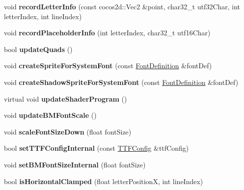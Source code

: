 \begin{DoxyCompactItemize}
void {\bfseries record\+Letter\+Info} (const cocos2d\+::\+Vec2 \&point, char32\+\_\+t utf32\+Char, int letter\+Index, int line\+Index)
\item 
\mbox{\label{classLabel_a8cd1070154b7311948770be1b573b10e}} 
void {\bfseries record\+Placeholder\+Info} (int letter\+Index, char32\+\_\+t utf16\+Char)
\item 
\mbox{\label{classLabel_afeb07526c7455452ee5546f5a81f6cd5}} 
bool {\bfseries update\+Quads} ()
\item 
\mbox{\label{classLabel_a23d6bc9e3ef5ebd8b73ae0ca532f942a}} 
void {\bfseries create\+Sprite\+For\+System\+Font} (const \hyperlink{structFontDefinition}{Font\+Definition} \&font\+Def)
\item 
\mbox{\label{classLabel_a162180bdc6b094d8665613b9db6bf3e9}} 
void {\bfseries create\+Shadow\+Sprite\+For\+System\+Font} (const \hyperlink{structFontDefinition}{Font\+Definition} \&font\+Def)
\item 
\mbox{\label{classLabel_af522fc3d86baaa53a2e2332abf031d92}} 
virtual void {\bfseries update\+Shader\+Program} ()
\item 
\mbox{\label{classLabel_ab7d2875d2dee0e220b422d7ad1fd64ea}} 
void {\bfseries update\+B\+M\+Font\+Scale} ()
\item 
\mbox{\label{classLabel_a13c95bbf705db3adf837a9691de4e34c}} 
void {\bfseries scale\+Font\+Size\+Down} (float font\+Size)
\item 
\mbox{\label{classLabel_a3733d5baac8cc51e28b2edf0a893fe21}} 
bool {\bfseries set\+T\+T\+F\+Config\+Internal} (const \hyperlink{structTTFConfig}{T\+T\+F\+Config} \&ttf\+Config)
\item 
\mbox{\label{classLabel_abd850b0e8b373f1ccc234fad57ff5dae}} 
void {\bfseries set\+B\+M\+Font\+Size\+Internal} (float font\+Size)
\item 
\mbox{\label{classLabel_a9694dcb391b00bb8b2addc10c4a7718c}} 
bool {\bfseries is\+Horizontal\+Clamped} (float letter\+PositionX, int line\+Index)
\item 

\end{DoxyCompactItemize}
